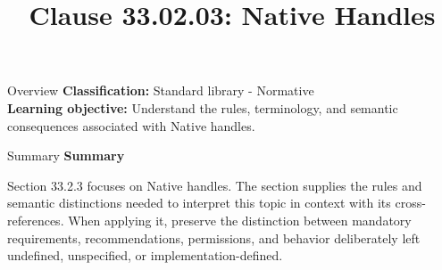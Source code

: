 \documentclass[10pt,letterpaper]{article}
\title{Clause 33.02.03: Native Handles}
\author{}
\date{}
\begin{document}
\maketitle
\begin{CornellOverviewBox}{Overview}
\textbf{Classification:} Standard library - Normative\\[2pt]
\textbf{Learning objective:} Understand the rules, terminology, and semantic consequences associated with Native handles.
\end{CornellOverviewBox}\begin{CornellSummaryBox}{Summary}
{\sffamily\bfseries\color{Accent} Summary}\par\vspace{3pt}Section 33.2.3 focuses on Native handles. The section supplies the rules and semantic distinctions needed to interpret this topic in context with its cross-references. When applying it, preserve the distinction between mandatory requirements, recommendations, permissions, and behavior deliberately left undefined, unspecified, or implementation-defined.
\end{CornellSummaryBox}
\end{document}
